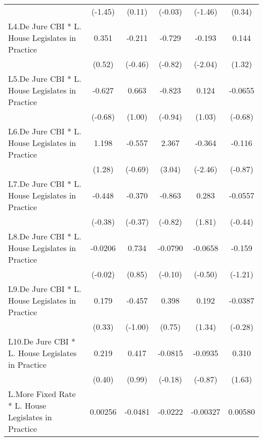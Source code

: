 {\begin{longtable}{l*{5}{c}}
                &  (-1.45)         &   (0.11)         &  (-0.03)         &  (-1.46)         &   (0.34)         \\
[1em]
L4.De Jure CBI * L. House Legislates in Practice&    0.351         &   -0.211         &   -0.729         &   -0.193\sym{*}  &    0.144         \\
                &   (0.52)         &  (-0.46)         &  (-0.82)         &  (-2.04)         &   (1.32)         \\
[1em]
L5.De Jure CBI * L. House Legislates in Practice&   -0.627         &    0.663         &   -0.823         &    0.124         &  -0.0655         \\
                &  (-0.68)         &   (1.00)         &  (-0.94)         &   (1.03)         &  (-0.68)         \\
[1em]
L6.De Jure CBI * L. House Legislates in Practice&    1.198         &   -0.557         &    2.367\sym{**} &   -0.364\sym{*}  &   -0.116         \\
                &   (1.28)         &  (-0.69)         &   (3.04)         &  (-2.46)         &  (-0.87)         \\
[1em]
L7.De Jure CBI * L. House Legislates in Practice&   -0.448         &   -0.370         &   -0.863         &    0.283         &  -0.0557         \\
                &  (-0.38)         &  (-0.37)         &  (-0.82)         &   (1.81)         &  (-0.44)         \\
[1em]
L8.De Jure CBI * L. House Legislates in Practice&  -0.0206         &    0.734         &  -0.0790         &  -0.0658         &   -0.159         \\
                &  (-0.02)         &   (0.85)         &  (-0.10)         &  (-0.50)         &  (-1.21)         \\
[1em]
L9.De Jure CBI * L. House Legislates in Practice&    0.179         &   -0.457         &    0.398         &    0.192         &  -0.0387         \\
                &   (0.33)         &  (-1.00)         &   (0.75)         &   (1.34)         &  (-0.28)         \\
[1em]
L10.De Jure CBI * L. House Legislates in Practice&    0.219         &    0.417         &  -0.0815         &  -0.0935         &    0.310         \\
                &   (0.40)         &   (0.99)         &  (-0.18)         &  (-0.87)         &   (1.63)         \\
[1em]
L.More Fixed Rate * L. House Legislates in Practice&  0.00256         &  -0.0481         &  -0.0222         & -0.00327         &  0.00580         \\

\end{longtable}}
